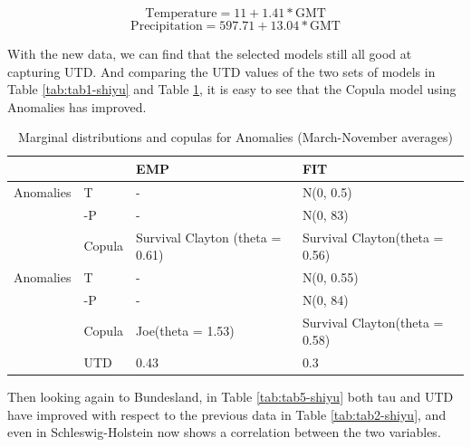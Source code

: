\documentclass[
]{krantz}
\begin{document}
\[\text{Temperature} = 11 + 1.41 * \text{GMT} \tag{21}\]
\[\text{Precipitation} = 597.71 + 13.04 * \text{GMT} \tag{22}\]

With the new data, we can find that the selected models still all good at capturing UTD. And comparing the UTD values of the two sets of models in Table \ref{tab:tab1-shiyu} and Table \ref{tab:tab4-shiyu}, it is easy to see that the Copula model using Anomalies has improved.

\begin{table}

\caption{\label{tab:tab4-shiyu}Marginal distributions and copulas for Anomalies (March-November averages)}
\centering
\begin{tabular}[t]{l|l|l|l}
\hline
 &  & EMP & FIT\\
\hline
Anomalies & T & - & N(0, 0.5)\\
\hline
 & -P & - & N(0, 83)\\
\hline
 & Copula & Survival Clayton (theta = 0.61) & Survival Clayton(theta = 0.56)\\
\hline
Anomalies & T & - & N(0, 0.55)\\
\hline
 & -P & - & N(0, 84)\\
\hline
 & Copula & Joe(theta = 1.53) & Survival Clayton(theta = 0.58)\\
\hline
 & UTD & 0.43 & 0.3\\
\hline
\end{tabular}
\end{table}

Then looking again to Bundesland, in Table \ref{tab:tab5-shiyu} both tau and UTD have improved with respect to the previous data in Table \ref{tab:tab2-shiyu}, and even in Schleswig-Holstein now shows a correlation between the two variables.
\end{document}

